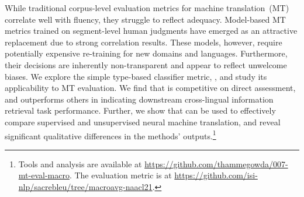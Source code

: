 



While traditional corpus-level evaluation metrics for machine translation~(MT) correlate well with fluency, they struggle to reflect adequacy.
Model-based MT metrics trained on segment-level human judgments have emerged as an attractive replacement due to strong correlation results.
These models, however, require potentially expensive re-training for new domains and languages.
Furthermore, their decisions are inherently non-transparent and appear to reflect unwelcome biases. 
We explore the simple type-based classifier metric, , and study its applicability to MT evaluation. 
We find that  is competitive on direct assessment, and outperforms others in indicating downstream cross-lingual information retrieval task performance.
Further, we show that  can be used to effectively compare supervised and unsupervised neural machine translation, and reveal significant qualitative differences in the methods' outputs.\footnote{Tools and analysis are available at \url{https://github.com/thammegowda/007-mt-eval-macro}.
The evaluation metric is at \url{https://github.com/isi-nlp/sacrebleu/tree/macroavg-naacl21}.
}

